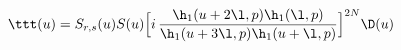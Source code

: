 \begin{equation}
\label{e:t}
\ttt(u) = S_{r,s}(u)S(u)
\Bigl[i\,\frac{\h_1(u+2\l,p)\h_1(\l,p)}{\h_1(u+3\l,p)\h_1(u+\l,p)}\Bigr]^{2N}
\D(u)
\end{equation}

